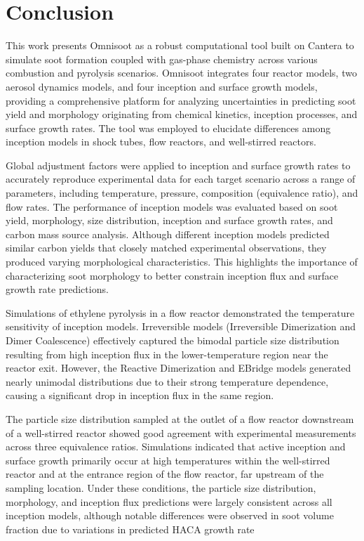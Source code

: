 \section{Conclusion}

This work presents Omnisoot as a robust computational tool built on Cantera to simulate soot formation coupled with gas-phase chemistry across various combustion and pyrolysis scenarios. Omnisoot integrates four reactor models, two aerosol dynamics models, and four inception and surface growth models, providing a comprehensive platform for analyzing uncertainties in predicting soot yield and morphology originating from chemical kinetics, inception processes, and surface growth rates. The tool was employed to elucidate differences among inception models in shock tubes, flow reactors, and well-stirred reactors.

Global adjustment factors were applied to inception and surface growth rates to accurately reproduce experimental data for each target scenario across a range of parameters, including temperature, pressure, composition (equivalence ratio), and flow rates. The performance of inception models was evaluated based on soot yield, morphology, size distribution, inception and surface growth rates, and carbon mass source analysis. Although different inception models predicted similar carbon yields that closely matched experimental observations, they produced varying morphological characteristics. This highlights the importance of characterizing soot morphology to better constrain inception flux and surface growth rate predictions.

Simulations of ethylene pyrolysis in a flow reactor demonstrated the temperature sensitivity of inception models. Irreversible models (Irreversible Dimerization and Dimer Coalescence) effectively captured the bimodal particle size distribution resulting from high inception flux in the lower-temperature region near the reactor exit. However, the Reactive Dimerization and EBridge models generated nearly unimodal distributions due to their strong temperature dependence, causing a significant drop in inception flux in the same region.

The particle size distribution sampled at the outlet of a flow reactor downstream of a well-stirred reactor showed good agreement with experimental measurements across three equivalence ratios. Simulations indicated that active inception and surface growth primarily occur at high temperatures within the well-stirred reactor and at the entrance region of the flow reactor, far upstream of the sampling location. Under these conditions, the particle size distribution, morphology, and inception flux predictions were largely consistent across all inception models, although notable differences were observed in soot volume fraction due to variations in predicted HACA growth rate